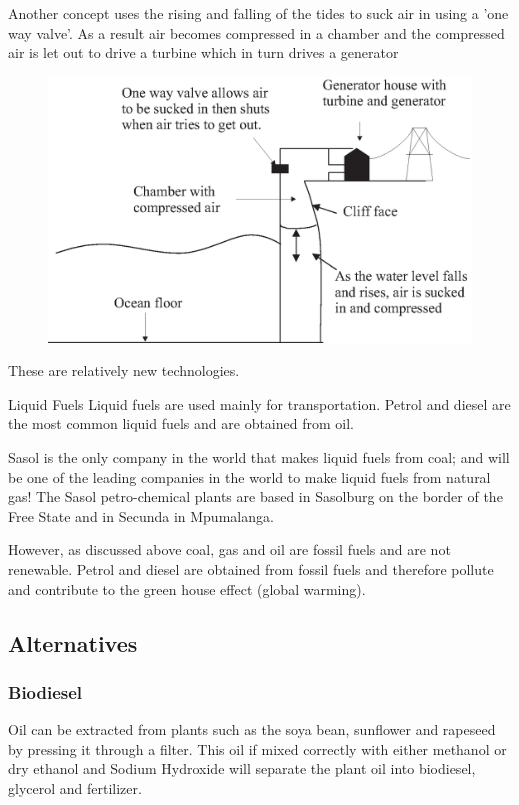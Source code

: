Another concept uses the rising and falling of the tides to suck air
in using a 'one way valve'. As a result air becomes compressed in a
chamber and the compressed air is let out to drive a turbine which
in turn drives a generator

\begin{figure}[H]
\centering
\includegraphics[scale=0.4]{../../epsimages/8hydroelectricocean2.eps}
\end{figure}

These are relatively new technologies.

Liquid Fuels Liquid fuels are used mainly for transportation. Petrol
and diesel are the most common liquid fuels and are obtained from
oil.

Sasol is the only company in the world that makes liquid fuels from
coal; and will be one of the leading companies in the world to make
liquid fuels from natural gas! The Sasol petro-chemical plants are
based in Sasolburg on the border of the Free State and in Secunda in
Mpumalanga.

However, as discussed above coal, gas and oil are fossil fuels and
are not renewable. Petrol and diesel are obtained from fossil fuels
and therefore pollute and contribute to the green house effect
(global warming).

\subsection*{Alternatives}

\subsubsection*{Biodiesel} Oil can be extracted from plants such as the
soya bean, sunflower and rapeseed by pressing it through a filter.
This oil if mixed correctly with either methanol or dry ethanol and
Sodium Hydroxide will separate the plant oil into biodiesel,
glycerol and fertilizer.

